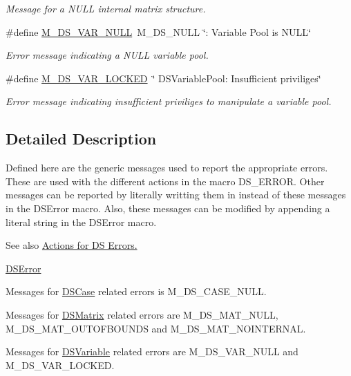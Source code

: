 \begin{DoxyCompactItemize}
\begin{DoxyCompactList}\small\item\em Message for a NULL internal matrix structure. \item\end{DoxyCompactList}\item 
\hypertarget{group___m___d_s___messages_gac31f10e693824b630ea7bd80f59acadf}{
\#define \hyperlink{group___m___d_s___messages_gac31f10e693824b630ea7bd80f59acadf}{M\_\-DS\_\-VAR\_\-NULL}~M\_\-DS\_\-NULL \char`\"{}: Variable Pool is NULL\char`\"{}}
\label{group___m___d_s___messages_gac31f10e693824b630ea7bd80f59acadf}

\begin{DoxyCompactList}\small\item\em Error message indicating a NULL variable pool. \item\end{DoxyCompactList}\item 
\hypertarget{group___m___d_s___messages_gaa3430366ad7beeafb53737b0174c5a0b}{
\#define \hyperlink{group___m___d_s___messages_gaa3430366ad7beeafb53737b0174c5a0b}{M\_\-DS\_\-VAR\_\-LOCKED}~\char`\"{} DSVariablePool: Insufficient priviliges\char`\"{}}
\label{group___m___d_s___messages_gaa3430366ad7beeafb53737b0174c5a0b}

\begin{DoxyCompactList}\small\item\em Error message indicating insufficient priviliges to manipulate a variable pool. \item\end{DoxyCompactList}\end{DoxyCompactItemize}


\subsection{Detailed Description}
Defined here are the generic messages used to report the appropriate errors. These are used with the different actions in the macro DS\_\-ERROR. Other messages can be reported by literally writting them in instead of these messages in the DSError macro. Also, these messages can be modified by appending a literal string in the DSError macro.

\begin{DoxySeeAlso}{See also}
\hyperlink{group___a___d_s___actions}{Actions for DS Errors.} 

\hyperlink{_d_s_errors_8h_a09b28eb2b01986855910ca97dfe91144}{DSError}
\end{DoxySeeAlso}
Messages for \hyperlink{struct_d_s_case}{DSCase} related errors is M\_\-DS\_\-CASE\_\-NULL.

Messages for \hyperlink{struct_d_s_matrix}{DSMatrix} related errors are M\_\-DS\_\-MAT\_\-NULL, M\_\-DS\_\-MAT\_\-OUTOFBOUNDS and M\_\-DS\_\-MAT\_\-NOINTERNAL.

Messages for \hyperlink{struct_d_s_variable}{DSVariable} related errors are M\_\-DS\_\-VAR\_\-NULL and M\_\-DS\_\-VAR\_\-LOCKED. 
